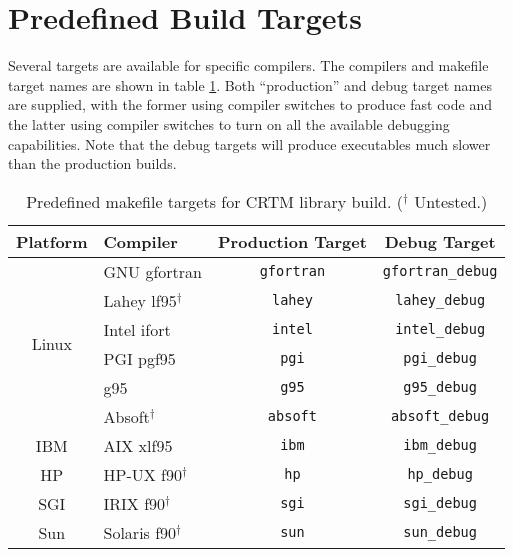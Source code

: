 \section{Predefined Build Targets}
Several targets are available for specific compilers. The compilers and makefile target names are shown in table \ref{tab:predefined_build_targets}. Both ``production'' and debug target names are supplied, with the former using compiler switches to produce fast code and the latter using compiler switches to turn on all the available debugging capabilities. Note that the debug targets will produce executables much slower than the production builds. 
\begin{table}[htp]
  \centering
  \begin{tabular}{clcc}
    \hline
    \sffamily\textbf{Platform} & \sffamily\textbf{Compiler} & \sffamily\textbf{Production Target} & \sffamily\textbf{Debug Target} \\
    \hline\hline
    \multirow{6}{*}{Linux} & GNU gfortran          & \texttt{gfortran} & \texttt{gfortran\_debug}\\
                           & Lahey lf95$^\dagger$  & \texttt{lahey}    & \texttt{lahey\_debug}   \\
                           & Intel ifort           & \texttt{intel}    & \texttt{intel\_debug}   \\
                           & PGI pgf95             & \texttt{pgi}      & \texttt{pgi\_debug}     \\
                           & g95                   & \texttt{g95}      & \texttt{g95\_debug}     \\
                           & Absoft$^\dagger$      & \texttt{absoft}   & \texttt{absoft\_debug}  \\[0.2cm]
    IBM                    & AIX xlf95             & \texttt{ibm}      & \texttt{ibm\_debug}     \\[0.2cm]
    HP                     & HP-UX f90$^\dagger$   & \texttt{hp}       & \texttt{hp\_debug}      \\[0.2cm]
    SGI                    & IRIX f90$^\dagger$    & \texttt{sgi}      & \texttt{sgi\_debug}     \\[0.2cm]
    Sun                    & Solaris f90$^\dagger$ & \texttt{sun}      & \texttt{sun\_debug}     \\
    \hline
  \end{tabular}
  \caption{Predefined makefile targets for CRTM library build. ($^\dagger$ Untested.)}
  \label{tab:predefined_build_targets}
\end{table}

